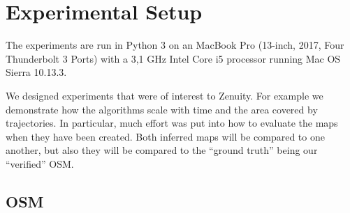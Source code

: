 \chapter{Experimental Setup}
\label{chp:experimental_setup}

The experiments are run in Python 3 on an MacBook Pro (13-inch, 2017, Four Thunderbolt 3 Ports) with a 3,1 GHz Intel Core i5 processor running Mac OS Sierra 10.13.3.

We designed experiments that were of interest to Zenuity. For example we demonstrate how the algorithms scale with time and the area covered by trajectories. In particular, much effort was put into how to evaluate the maps when they have been created. Both inferred maps will be compared to one another, but also they will be compared to the ``ground truth'' being our ``verified'' \ac{OSM}. 


\section{OSM}
\label{chp:experimental_setup.sec:osm}
 
